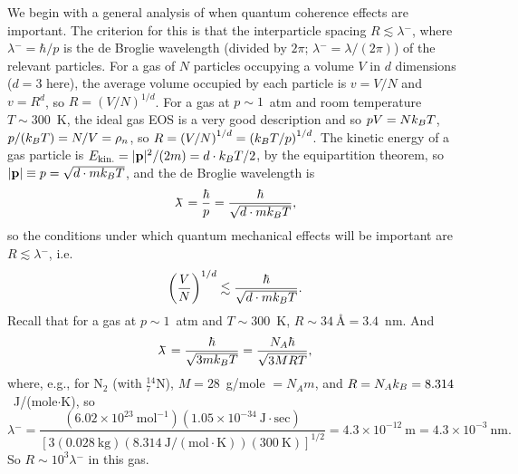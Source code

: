 We begin with a general analysis of when quantum coherence effects are important. The criterion for this is that the
interparticle spacing $R\lesssim\lambda\!\!\!^-$, where $\lambda\!\!\!^- = \hbar/p$ is the de Broglie wavelength (divided
by $2\pi$; $\lambda\!\!\!^- = \lambda/(2\pi)$) of the relevant particles. For a gas of $N$ particles occupying a volume $V$
in $d$ dimensions ($d = 3$ here), the average volume occupied by each particle is $v = V/N$ and $v = R^d$, so
$R = \left(V/N\right)^{1/d}$. For a gas at $p\sim 1$~atm and room temperature $T\sim 300$~K, the ideal gas EOS is a very good description
and so $pV = Nk_{B} T$, $p/(k_{B} T) = N/V = \rho_n$, so $R = \left(V/N\right)^{1/d} = \left(k_{B} T/p\right)^{1/d}$. The kinetic
energy of a gas particle is $E_{\text{kin.}} = |\mathbf p|^2/(2m) = d\cdot k_{B} T/2$, by the equipartition theorem, so
$|\mathbf p|\equiv p = \sqrt{d\cdot mk_{B} T}$, and the de Broglie wavelength is
\begin{equation}
  \lambda\!\!\!^- = \frac{\hbar}{p} = \frac{\hbar}{\sqrt{d\cdot mk_{B} T}},
\end{equation}
so the conditions under which quantum mechanical effects will be important are $R\lesssim\lambda\!\!\!^-$, i.e.
\begin{equation}
  \left(\frac{V}{N}\right)^{1/d}\lesssim\frac{\hbar}{\sqrt{d\cdot mk_{B} T}}.
\end{equation}
Recall that for a gas at $p\sim 1$~atm and $T\sim 300$~K, $R\sim 34\ \text{\AA} = 3.4$~nm. And
\begin{equation}
  \lambda\!\!\!^- = \frac{\hbar}{\sqrt{3mk_{B} T}} = \frac{N_A\hbar}{\sqrt{3MRT}},
\end{equation}
where, e.g., for N$_2$ (with $^{14}_7$N), $M = 28$~g/mole $= N_Am$, and $R = N_Ak_{B} = 8.314$~J/(mole$\cdot$K), so
\begin{equation}
  \lambda\!\!\!^- = \frac{(6.02\times 10^{23}\ \text{mol}^{-1})(1.05\times 10^{-34}\ \text{J}\cdot\text{sec})}{\left[3(0.028\ \text{kg})\left(8.314\ \text{J}/(\text{mol}\cdot\text{K})\right)(300\ \text{K})\right]^{1/2}}
  = 4.3\times 10^{-12}\ \text{m} = 4.3\times 10^{-3}\ \text{nm}.
\end{equation}
So $R\sim 10^3\lambda\!\!\!^-$ in this gas.


